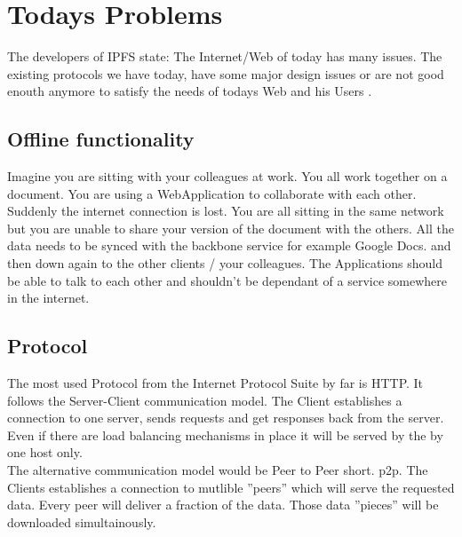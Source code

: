 \documentclass[a4paper,11pt, oneside]{report}
\theoremstyle{definition}
\begin{document}
\chapter{Todays Problems}
The developers of IPFS  state: The Internet/Web of today has many issues.  The existing protocols we have today, have some major design issues or are not good enouth anymore to satisfy the needs of todays Web and his Users \cite{TodaysProblems}.


\section{Offline functionality}
Imagine you are sitting with your colleagues at work. You all work together on a document. You are using a WebApplication to collaborate with each other. Suddenly the internet connection is lost. You are all sitting in the same network but you are unable to share your version of the document with the others. All the data needs to be synced with the backbone service for example Google Docs. and then down again to the other clients / your colleagues. The Applications should be able to talk to each other and shouldn't be dependant of a service somewhere in the internet.

\section{Protocol}
The most used Protocol from the Internet Protocol Suite by far is HTTP. It follows the Server-Client communication model. The Client establishes a connection to one server, sends requests and get responses back from the server. Even if there are load balancing mechanisms in place it will be served by the by one host only.\\[0.3cm]
The alternative communication model would be Peer to Peer short. p2p. The Clients establishes a connection to mutlible ''peers'' which will serve the requested data. Every peer will deliver a fraction of the data. Those data ''pieces'' will be downloaded simultainously.

\newpage
\end{document}
